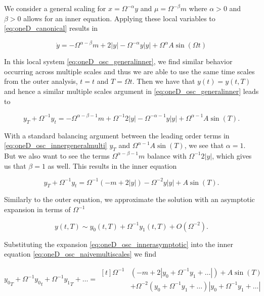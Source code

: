We consider a general scaling for $x=\Omega^{-\alpha}y$ and $\mu = \Omega^{-\beta}m$ where $\alpha>0$ and $\beta>0$ allows for an inner equation. Applying these local variables to \eqref{eq:oneD_canonical} results in

\begin{equation}\label{eq:oneD_osc_generalinner}
\dot{y} = -\Omega^{\alpha-\beta}m+2|y|-\Omega^{-\alpha}y|y|+\Omega^{\alpha}A\sin(\Omega t)
\end{equation}

In this local system \eqref{eq:oneD_osc_generalinner}, we find similar behavior occurring across multiple scales and thus we are able to use the same time scales from the outer analysis, $t=t$ and $T=\Omega t$. Then we have that $y(t)=y(t,T)$ and hence a similar multiple scales argument in \eqref{eq:oneD_osc_generalinner} leads to

\begin{equation}\label{eq:oneD_osc_innergeneralmulti}
y_T+\Omega^{-1}y_t = - \Omega^{\alpha-\beta-1}m+\Omega^{-1}2|y|-\Omega^{-\alpha-1}y|y|+\Omega^{\alpha-1}A\sin(T).
\end{equation}

With a standard balancing argument between the leading order terms in \eqref{eq:oneD_osc_innergeneralmulti} $y_T$ and $\Omega^{\alpha-1} A\sin(T)$, we see that $\alpha=1$. But we also want to see the terms $\Omega^{\alpha-\beta-1}m$ balance with $\Omega^{-1}2|y|$, which gives us that $\beta=1$ as well. This results in the inner equation

\begin{equation}\label{eq:oneD_osc_naivemultiscales}
y_T+\Omega^{-1}y_t = \Omega^{-1}\left(-m+2|y|\right)-\Omega^{-2}y|y|+A\sin(T).
\end{equation}

Similarly to the outer equation, we approximate the solution with an asymptotic expansion in terms of $\Omega^{-1}$ 

\begin{equation}\label{eq:oneD_osc_innerasymptotic}
y(t,T)\sim y_0(t,T)+\Omega^{-1}y_1(t,T)+O(\Omega^{-2}).
\end{equation}

Substituting the expansion \eqref{eq:oneD_osc_innerasymptotic} into the inner equation \eqref{eq:oneD_osc_naivemultiscales} we find

\begin{equation*}
{y_0}_T+\Omega^{-1}{y_0}_t+\Omega^{-1}{y_1}_T+\ldots =\begin{aligned}[t]\Omega^{-1}&(-m+2|y_0+\Omega^{-1}y_1+\ldots|)+A\sin(T)\\
&+\Omega^{-2}(y_0+\Omega^{-1}y_1+\ldots)|y_0+\Omega^{-1}y_1+\ldots|
\end{aligned}
\end{equation*}

